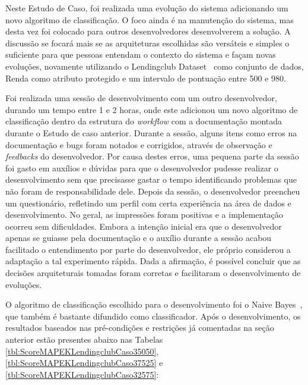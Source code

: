 \documentclass[twocolumn]{article}
\begin{document}
Neste Estudo de Caso, foi realizada uma evolução do sistema adicionando um novo algoritmo de classificação. O foco ainda é na manutenção do sistema, mas desta vez foi colocado para outros desenvolvedores desenvolverem a solução. A discussão se focará mais se as arquiteturas escolhidas são versáteis e simples o suficiente para que pessoas entendam o contexto do sistema e façam novas evoluções, novamente utilizando o Lendingclub Dataset~\citep{lendingclub_2022} como conjunto de dados, Renda como atributo protegido e um intervalo de pontuação entre 500 e 980. 

Foi realizada uma sessão de desenvolvimento com um outro desenvolvedor, durando um tempo entre 1 e 2 horas, onde este adicionou um novo algoritmo de classificação dentro da estrutura do \textit{workflow} com a documentação montada durante o Estudo de caso anterior. Durante a sessão, alguns itens como erros na documentação e bugs foram notados e corrigidos, através de observação e \textit{feedbacks} do desenvolvedor. Por causa destes erros, uma pequena parte da sessão foi gasto em auxílios e dúvidas para que o desenvolvedor pudesse realizar o desenvolvimento sem que precisasse gastar o tempo identificando problemas que não foram de responsabilidade dele. Depois da sessão, o desenvolvedor preencheu um questionário, refletindo um perfil com certa experiência na área de dados e desenvolvimento. No geral, as impressões foram positivas e a implementação ocorreu sem dificuldades. Embora a intenção inicial era que o desenvolvedor apenas se guiasse pela documentação e o auxílio durante a sessão acabou facilitado o entendimento por parte do desenvolvedor, ele próprio considerou a adaptação a tal experimento rápida. Dada a afirmação, é possível concluir que as decisões arquiteturais tomadas foram corretas e facilitaram o desenvolvimento de evoluções.

O algoritmo de classificação escolhido para o desenvolvimento foi o Naive Bayes~\citep{Naive_Bayes_2004}, que também é bastante difundido como classificador. Após o desenvolvimento, os resultados baseados nas pré-condições e restrições já comentadas na seção anterior estão presentes abaixo nas Tabelas \ref{tbl:ScoreMAPEKLendingclubCaso35050}, \ref{tbl:ScoreMAPEKLendingclubCaso37525} e \ref{tbl:ScoreMAPEKLendingclubCaso32575}:
\end{document}
